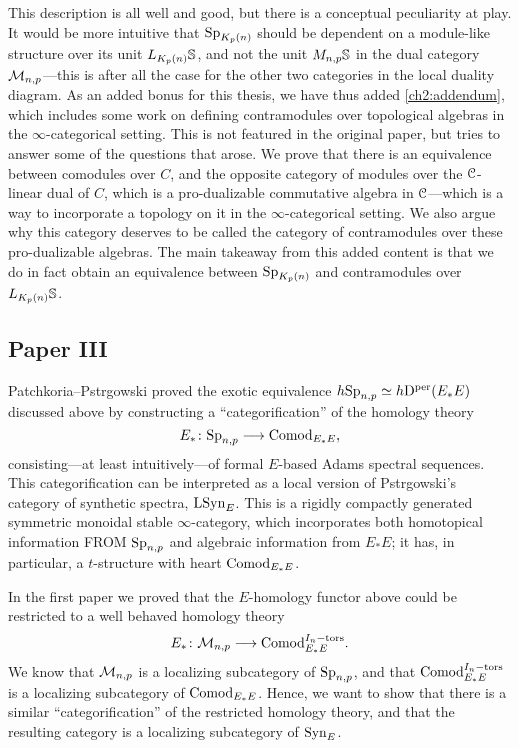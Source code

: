 This description is all well and good, but there is a conceptual peculiarity at play. It would be more intuitive that $\mathrm{Sp}_{K_p(n)}$ should be dependent on a module-like structure over its unit $L_{K_p(n)} \mathbb{S}$, and not the unit $M_{n,p} \mathbb{S}$ in the dual category $\mathcal{M}_{n,p}$---this is after all the case for the other two categories in the local duality diagram. As an added bonus for this thesis, we have thus added \cref{ch2:addendum}, which includes some work on defining contramodules over topological algebras in the $\infty$-categorical setting. This is not featured in the original paper, but tries to answer some of the questions that arose. We prove that there is an equivalence between comodules over $C$, and the opposite category of modules over the $\EuScript{C}$-linear dual of $C$, which is a pro-dualizable commutative algebra in $\EuScript{C}$---which is a way to incorporate a topology on it in the $\infty$-categorical setting. We also argue why this category deserves to be called the category of contramodules over these pro-dualizable algebras. The main takeaway from this added content is that we do in fact obtain an equivalence between $\mathrm{Sp}_{{K_p(n)}}$ and contramodules over $L_{K_p(n)}\mathbb{S}$. 









\subsection{Paper III}

Patchkoria--Pstr\a{}gowski proved the exotic equivalence $h\mathrm{Sp}_{n,p} \simeq h\mathrm{D}^{\mathrm{per}}(E_*E)$ discussed above by constructing a ``categorification'' of the homology theory 
\[E_* \colon \mathrm{Sp}_{n,p} \longrightarrow \mathrm{Comod}_{E_*E},\]
consisting---at least intuitively---of formal $E$-based Adams spectral sequences. This categorification can be interpreted as a local version of Pstr\a{}gowski's category of synthetic spectra, $\mathrm{LSyn}_{E}$. This is a rigidly compactly generated symmetric monoidal stable $\infty$-category, which incorporates both homotopical information FROM $\mathrm{Sp}_{n,p}$ and algebraic information from $E_*E$; it has, in particular, a $t$-structure with heart $\mathrm{Comod}_{E_*E}$. 

In the first paper we proved that the $E$-homology functor above could be restricted to a well behaved homology theory 
\[E_* \colon \mathcal{M}_{n,p} \longrightarrow \mathrm{Comod}_{E_*E}^{I_n-\mathrm{tors}}.\]
We know that $\mathcal{M}_{n,p}$ is a localizing subcategory of $\mathrm{Sp}_{n,p}$, and that $\mathrm{Comod}_{E_*E}^{I_n-\mathrm{tors}}$ is a localizing subcategory of $\mathrm{Comod}_{E_*E}$. Hence, we want to show that there is a similar ``categorification'' of the restricted homology theory, and that the resulting category is a localizing subcategory of $\mathrm{Syn}_{E}$.  

